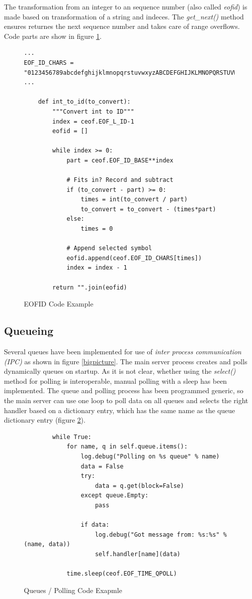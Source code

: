 The transformation from an integer to an sequence 
number (also called \textit{eofid}) is made based on transformation
of a string and indeces. The \textit{get\_next()} method ensures returnes
the next sequence number and takes care of range overflows.
Code parts are show in figure \ref{eofid}.
\begin{figure}[htb]
\caption{EOFID Code Example}
\label{eofid}
\begin{verbatim}
...
EOF_ID_CHARS = "0123456789abcdefghijklmnopqrstuvwxyzABCDEFGHIJKLMNOPQRSTUVWXYZ-!"
...

    def int_to_id(to_convert):
        """Convert int to ID"""
        index = ceof.EOF_L_ID-1
        eofid = []

        while index >= 0:
            part = ceof.EOF_ID_BASE**index

            # Fits in? Record and subtract
            if (to_convert - part) >= 0:
                times = int(to_convert / part)
                to_convert = to_convert - (times*part)
            else:
                times = 0 

            # Append selected symbol
            eofid.append(ceof.EOF_ID_CHARS[times])
            index = index - 1 

        return "".join(eofid)
\end{verbatim}
\end{figure}
\subsection{Queueing}
Several queues have been implemented for use of 
\textit{inter process communication (IPC)} as shown in figure \ref{bigpicture}.
The main server process creates and polls dynamically queues on startup.
As it is not clear, whether using the \textit{select()} method
for polling is interoperable, manual polling with a sleep has been 
implemented. The queue and polling process
has been programmed generic, so the main server can use one loop
to poll data on all queues and selects the right handler based on
a dictionary entry, which has the same name as the queue dictionary
entry (figure \ref{queuepoll}).
\begin{figure}[htb]
\caption{Queues / Polling Code Exapmle}
\label{queuepoll}
\begin{verbatim}
        while True:
            for name, q in self.queue.items():
                log.debug("Polling on %s queue" % name)
                data = False
                try:
                    data = q.get(block=False)
                except queue.Empty:
                    pass

                if data:
                    log.debug("Got message from: %s:%s" % (name, data))
                    self.handler[name](data)

            time.sleep(ceof.EOF_TIME_QPOLL)
\end{verbatim}
\end{figure}
